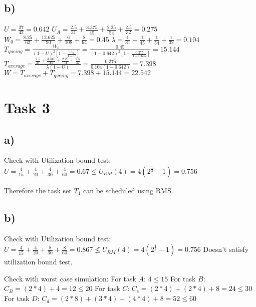 \documentclass[10pt,a4paper]{article}
\begin{document}
\subsection*{b)}
$U = \frac{27}{42} = 0.642$
\newline
$U_A = \frac{2.5}{31} + \frac{3.375}{45} + \frac{2.25}{54} + \frac{2.5}{32} = 0.275$
\newline
$W_0 = \frac{8.25}{62} + \frac{12.625}{90} + \frac{6}{108} + \frac{8}{64} = 0.45$
\newline
$\lambda = \frac{1}{31} + \frac{1}{45} + \frac{1}{54} + \frac{1}{32} = 0.104$
\newline
$T_{queing} = \frac{W_0}{(1-U)^2[1 - \frac{U_A}{1 - U}]} = \frac{0.45}{(1-0.642)^2[1 - \frac{0.275}{1 - 0.642}]} = 15.144$
\newline
$T_{average} = \frac{\frac{2.5}{31} + \frac{3.375}{45} + \frac{2.25}{54} + \frac{2.5}{32}}{\lambda(1 - U)} = \frac{0.275}{0.104(1 - 0.642)} = 7.398$
\newline
$W = T_{average} + T_{queing} = 7.398 + 15.144 = 22.542$
\section*{Task 3}
\subsection*{a)}
Check with Utilization bound test:
\newline
$U = \frac{4}{15} + \frac{4}{20} + \frac{4}{30} + \frac{4}{60} = 0.67 \leq U_{RM}(4) = 4(2^{\frac{1}{4}} - 1) = 0.756$

Therefore the task set $T_1$ can be scheduled using RMS.

\subsection*{b)}
Check with Utilization bound test:
\newline
$U = \frac{4}{15} + \frac{4}{20} + \frac{8}{30} + \frac{8}{60} = 0.867 \nleq U_{RM}(4) = 4(2^{\frac{1}{4}} - 1) = 0.756$
Doesn't satisfy  utilization bound test.

Check with worst case simulation:
\newline
For task $A$: $4 \leq 15$
\newline
For task $B$: $C_B = (2 * 4) + 4 = 12 \leq 20$
\newline
For task $C$: $C_c = (2 * 4) + (2 * 4) + 8 = 24 \leq 30$
\newline
For task $D$: $C_d = (2 * 8) + (3 * 4) + (4 * 4) + 8 = 52 \leq 60$
\end{document}
